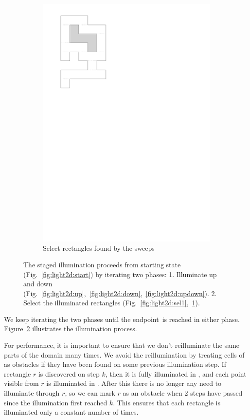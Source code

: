 \documentclass[english,gradu]{tktltiki2018}
\begin{document}
\begin{figure}
\begin{subfigure}[t]{0.15\textwidth}
		\includegraphics[width=\textwidth,page=7]{fig/light2d}
		\caption{Select rectangles found by the sweeps}\label{fig:light2d:sel2}
	\end{subfigure}
	\caption{The staged illumination proceeds from starting state (Fig.~\ref{fig:light2d:start}) by iterating two phases:
	1. Illuminate up and down (Fig.~\ref{fig:light2d:up},~\ref{fig:light2d:down},~\ref{fig:light2d:updown}).
	2. Select the illuminated rectangles (Fig.~\ref{fig:light2d:sel1},~\ref{fig:light2d:sel2}).
	}\label{fig:light2d}
\end{figure}

We keep iterating the two phases until the endpoint~\ept is reached in either phase.
Figure~\ref{fig:light2d} illustrates the illumination process.

For performance, it is important to ensure that we don't reilluminate the same parts of the domain many times.
We avoid the reillumination by treating cells of  as obstacles if they have been found on some previous illumination step.
If rectangle $r$ is discovered on step $k$, then it is fully illuminated in , and each point visible from $r$ is illuminated in .
After this there is no longer any need to illuminate through $r$, so we can mark $r$ as an obstacle when 2 steps have passed since the illumination first reached $k$.
This ensures that each rectangle is illuminated only a constant number of times.
\end{document}
